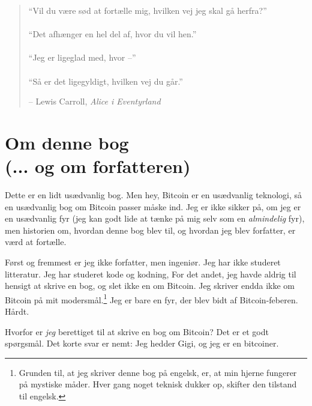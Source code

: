 \documentclass[paper=6in:9in,pagesize=pdftex,headinclude=on,footinclude=on,12pt]{scrbook}
\begin{document}
\newpage \vspace*{4cm}
\thispagestyle{fancy}
\begin{quotation}
\begin{center}
  \large \enquote{Vil du være sød at fortælle mig, hvilken vej jeg skal gå herfra?} \\~\\ \enquote{Det afhænger en hel del af, hvor du vil hen.} \\~\\ \enquote{Jeg er ligeglad med, hvor --} \\~\\ \enquote{Så er det ligegyldigt, hvilken vej du går.} \end{center}
\begin{flushright} -- Lewis Carroll, \textit{Alice i Eventyrland}\end{flushright}
\end{quotation}

\tableofcontents

\def\bitcoinB{\leavevmode{\setbox0=\hbox{\textsf{B}}%
    \dimen0\ht0 \advance\dimen0 0.2ex
    \ooalign{\hfil \box0\hfil\cr
      \hfil\vrule height \dimen0 depth.2ex\hfil\cr
    }%
  }%
}

\chapter*{Om denne bog \\ (... og om forfatteren)}

Dette er en lidt usædvanlig bog. Men hey, Bitcoin er en usædvanlig teknologi, så en usædvanlig bog om Bitcoin passer måske ind. Jeg er ikke sikker på, om jeg er en usædvanlig fyr (jeg kan godt lide at tænke på mig selv som en \textit{almindelig} fyr), men historien om, hvordan denne bog blev til, og hvordan jeg blev forfatter, er værd at fortælle.

Først og fremmest er jeg ikke forfatter, men ingeniør. Jeg har ikke studeret litteratur. Jeg har studeret kode og kodning, For det andet, jeg havde aldrig til hensigt at skrive en bog, og slet ikke en om Bitcoin. Jeg skriver endda ikke om Bitcoin på mit modersmål.\footnote{Grunden til, at jeg skriver denne bog på engelsk, er, at min hjerne fungerer på mystiske måder. Hver gang noget teknisk dukker op, skifter den tilstand til engelsk.} Jeg er bare en fyr, der blev bidt af Bitcoin-feberen. Hårdt.

Hvorfor er \textit{jeg} berettiget til at skrive en bog om Bitcoin? Det er et godt spørgsmål. Det korte svar er nemt: Jeg hedder Gigi, og jeg er en bitcoiner.
\end{document}
